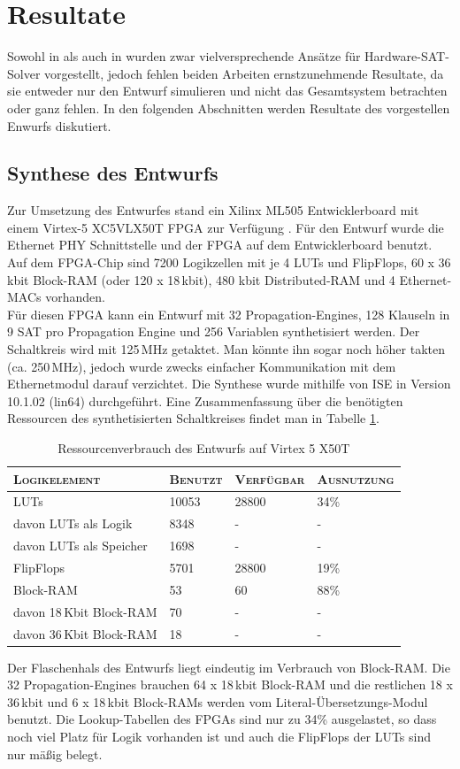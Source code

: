 \section{Resultate}
Sowohl in \cite{davis:2008} als auch in \cite{haller:2010} wurden zwar
vielversprechende Ansätze für Hardware-SAT-Solver vorgestellt, 
jedoch fehlen beiden Arbeiten ernstzunehmende Resultate,
da sie entweder  nur den Entwurf simulieren 
und nicht das Gesamtsystem betrachten oder ganz fehlen.
In den folgenden Abschnitten werden Resultate des
vorgestellen Enwurfs diskutiert.

\subsection{Synthese des Entwurfs}
Zur Umsetzung des Entwurfes stand ein Xilinx ML505
Entwicklerboard \cite{xilinxml505:2011} mit einem Virtex-5
XC5VLX50T FPGA \cite{xilinxvirtex5:2009} zur Verfügung .
Für den Entwurf wurde die Ethernet PHY Schnittstelle und
der FPGA auf dem Entwicklerboard benutzt.
Auf dem FPGA-Chip sind 7200 Logikzellen mit je 4 LUTs und FlipFlops, 
60 x 36\,kbit Block-RAM (oder 120 x 18\,kbit),
480 kbit Distributed-RAM und 4 Ethernet-MACs vorhanden.\\
Für diesen FPGA kann ein Entwurf mit 32 Propagation-Engines, 128 Klauseln in 9 SAT pro
Propagation Engine und 256 Variablen synthetisiert werden. Der Schaltkreis wird mit
125\,MHz getaktet. Man könnte ihn sogar noch höher takten (ca. 250\,MHz), jedoch wurde zwecks einfacher
Kommunikation mit dem Ethernetmodul darauf verzichtet.
Die Synthese wurde mithilfe von ISE in Version 10.1.02 (lin64) durchgeführt.
Eine Zusammenfassung über die benötigten Ressourcen des synthetisierten Schaltkreises findet man in 
Tabelle \ref{ressources}.
\begin{table}[h]
  \begin{tabular}{|l|l|l|l|}
    \hline
    \textsc{Logikelement} & \textsc{Benutzt} & \textsc{Verfügbar} &\textsc{Ausnutzung}\\
    \hline
    \hline
    LUTs & 10053 & 28800 & 34\%\\
    \hline
    davon LUTs als Logik & 8348 & - & -\\
    \hline
    davon LUTs als Speicher & 1698 & - & -\\
    \hline
    FlipFlops & 5701 & 28800 & 19\%\\
    \hline
    Block-RAM & 53 & 60 & 88\%\\
    \hline
    davon 18\,Kbit Block-RAM & 70 & - & -\\
    \hline
    davon 36\,Kbit Block-RAM & 18 & - & -\\
    \hline
  \end{tabular}
  \caption{Ressourcenverbrauch des Entwurfs auf Virtex 5 X50T}
  \label{ressources}
\end{table}
Der Flaschenhals des Entwurfs liegt eindeutig im Verbrauch von Block-RAM.
Die 32 Propagation-Engines brauchen 64 x 18\,kbit Block-RAM und die
restlichen 18 x 36\,kbit und 6 x 18\,kbit Block-RAMs werden vom 
Literal-Übersetzungs-Modul benutzt. Die Lookup-Tabellen des FPGAs sind
nur zu 34\% ausgelastet, so dass noch viel Platz für Logik vorhanden ist
und auch die FlipFlops der LUTs sind nur mäßig belegt.


